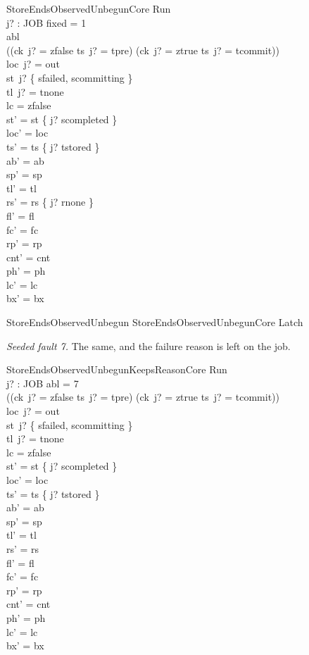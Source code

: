 \documentclass[a4paper,10pt,fleqn]{article}
\begin{document}
\begin{schema}{StoreEndsObservedUnbegunCore}
\Delta Run \\ j? : JOB
\where
fixed = 1 \\
abl  \\
((ck~j? = zfalse \land ts~j? = tpre) \lor (ck~j? = ztrue \land ts~j? = tcommit)) \\
loc~j? = out \\
st~j? \in \{ sfailed, scommitting \} \\
tl~j? = tnone \\
lc = zfalse \\
st' = st \oplus \{ j? \mapsto scompleted \} \\
loc' = loc \\
ts' = ts \oplus \{ j? \mapsto tstored \} \\
ab' = ab \\
sp' = sp \\
tl' = tl \\
rs' = rs \oplus \{ j? \mapsto rnone \} \\
fl' = fl \\
fc' = fc \\
rp' = rp \\
cnt' = cnt \\
ph' = ph \\
lc' = lc \\
bx' = bx
\end{schema}

\begin{zed}
StoreEndsObservedUnbegun  StoreEndsObservedUnbegunCore \land Latch
\end{zed}

\emph{Seeded fault 7.} The same, and the failure reason is left on the job.

\begin{schema}{StoreEndsObservedUnbegunKeepsReasonCore}
\Delta Run \\ j? : JOB
\where
abl = 7 \\
((ck~j? = zfalse \land ts~j? = tpre) \lor (ck~j? = ztrue \land ts~j? = tcommit)) \\
loc~j? = out \\
st~j? \in \{ sfailed, scommitting \} \\
tl~j? = tnone \\
lc = zfalse \\
st' = st \oplus \{ j? \mapsto scompleted \} \\
loc' = loc \\
ts' = ts \oplus \{ j? \mapsto tstored \} \\
ab' = ab \\
sp' = sp \\
tl' = tl \\
rs' = rs \\
fl' = fl \\
fc' = fc \\
rp' = rp \\
cnt' = cnt \\
ph' = ph \\
lc' = lc \\
bx' = bx
\end{schema}
\end{document}
